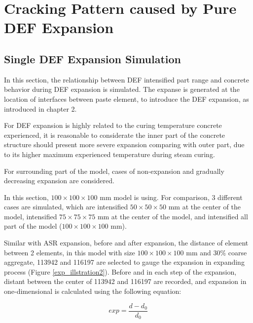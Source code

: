 \clearpage
\section{Cracking Pattern caused by Pure DEF Expansion}

\subsection{Single DEF Expansion Simulation}

In this section, the relationship between DEF intensified part range and concrete behavior during DEF expansion is simulated. The expanse is generated at the location of interfaces between paste element, to introduce the DEF expansion, as introduced in chapter 2.

For DEF expansion is highly related to the curing temperature concrete experienced, it is reasonable to considerate the inner part of the concrete structure should present more severe expansion comparing with outer part, due to its higher maximum experienced temperature during steam curing.

For surrounding part of the model, cases of non-expansion and gradually decreasing expansion are considered.

In this section, $100 \times 100 \times 100$ mm model is using. For comparison, 3 different cases are simulated, which are intensified $50 \times 50 \times 50$ mm at the center of the model, intensified $75 \times 75 \times 75$ mm at the center of the model, and intensified all part of the model ($100 \times 100 \times 100$ mm).

Similar with ASR expansion, before and after expansion, the distance of element between 2 elements, in this model with size $100 \times 100 \times 100$ mm and 30\% coarse aggregate, 113942 and 116197 are selected to gauge the expansion in expanding process (Figure \ref{exp_illstration2}). Before and in each step of the expansion, distant between the center of 113942 and 116197 are recorded, and expansion in one-dimensional is calculated using the following equation:


\begin{equation}
  exp = \frac{d-d_0}{d_0}
\end{equation}

